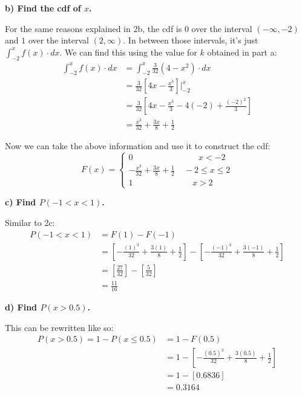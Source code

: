 \documentclass[12pt, letter]{article}
\begin{document}
\qquad \textbf{b) Find the cdf of $x$.}
\begin{center}
	For the same reasons explained in 2b, the cdf is $0$ over the interval $(-\infty, -2)$ and $1$ over the interval $(2, \infty)$. In between those intervals, it's just $\int_{-2}^{x} f(x) \cdot dx$. We can find this using the value for $k$ obtained in part a:
	\begin{align*}
		\int_{-2}^{x} f(x) \cdot dx &= \int_{-2}^{x} \frac{3}{32}(4 - x^{2}) \cdot dx \\
		&= \frac{3}{32}\left[4x - \frac{x^{3}}{3}\right] \Bigg|_{-2}^{x} \\
		&= \frac{3}{32}\left[4x - \frac{x^{3}}{3} - 4(-2) + \frac{(-2)^{2}}{3}\right] \\
		&= \frac{x^{3}}{32} + \frac{3x}{8} + \frac{1}{2}
	\end{align*}
	
	\pagebreak	
	
	Now we can take the above information and use it to construct the cdf:
	\[F(x) = \left\{
    		\begin{array}{cc}
    			0 & \qquad x < -2 \\
    			-\frac{x^{3}}{32} + \frac{3x}{8} + \frac{1}{2} & \; -2 \le x \le 2 \\
        		1 & \quad \; x > 2
        	\end{array}
        \right.\]
\end{center}

\qquad \textbf{c) Find $P(-1 < x < 1)$.}
\begin{center}
	Similar to 2c:
	\begin{align*}
		P(-1 < x < 1) &= F(1) - F(-1) \\
		&= \left[-\frac{(1)^{3}}{32} + \frac{3(1)}{8} + \frac{1}{2}\right] - \left[-\frac{(-1)^{3}}{32} + \frac{3(-1)}{8} + \frac{1}{2}\right] \\
		&= \left[\frac{27}{32}\right] - \left[\frac{5}{32}\right] \\
		&= \boxed{\frac{11}{16}}
	\end{align*}
\end{center}

\qquad \textbf{d) Find $P(x > 0.5)$.}
\begin{center}
	This can be rewritten like so:
	\begin{align*}
		P(x > 0.5) = 1 - P(x \le 0.5) &= 1 - F(0.5) \\
		&= 1 - \left[-\frac{(0.5)^{3}}{32} + \frac{3(0.5)}{8} + \frac{1}{2}\right] \\
		&= 1 - [0.6836] \\
		&= \boxed{0.3164}
	\end{align*}
\end{center}
\end{document}
